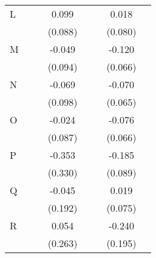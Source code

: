 \begin{longtable}{l*{3}{c}|l*{3}{c}}
	L                   &                     &                     &       0.099         &                     &                     &       0.018         \\
	&                     &                     &     (0.088)         &                     &                     &     (0.080)         \\
	M                   &                     &                     &      -0.049         &                     &                     &      -0.120\sym{*}  \\
	&                     &                     &     (0.094)         &                     &                     &     (0.066)         \\
	N                   &                     &                     &      -0.069         &                     &                     &      -0.070         \\
	&                     &                     &     (0.098)         &                     &                     &     (0.065)         \\
	O                   &                     &                     &      -0.024         &                     &                     &      -0.076         \\
	&                     &                     &     (0.087)         &                     &                     &     (0.066)         \\
	P                   &                     &                     &      -0.353         &                     &                     &      -0.185\sym{**} \\
	&                     &                     &     (0.330)         &                     &                     &     (0.089)         \\
	Q                   &                     &                     &      -0.045         &                     &                     &       0.019         \\
	&                     &                     &     (0.192)         &                     &                     &     (0.075)         \\
	R                   &                     &                     &       0.054         &                     &                     &      -0.240         \\
	&                     &                     &     (0.263)         &                     &                     &     (0.195)         \\

\end{longtable}
